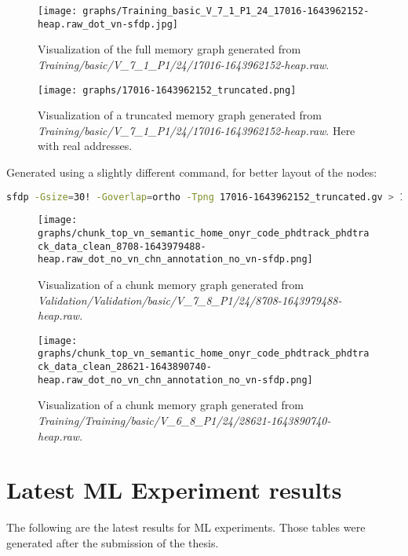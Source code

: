 \begin{figure}[H]\label{appendix:mem_graph:17016-1643962152:full}
    \centering
    \texttt{[image: graphs/Training\_basic\_V\_7\_1\_P1\_24\_17016-1643962152-heap.raw\_dot\_vn-sfdp.jpg]}
    \caption{Visualization of the full memory graph generated from \textit{Training/basic/V\_7\_1\_P1/24/17016-1643962152-heap.raw}.}
\end{figure}

\begin{figure}[H]\label{appendix:mem_graph:17016-1643962152:truncated}
    \centering
    \texttt{[image: graphs/17016-1643962152\_truncated.png]}
    \caption{Visualization of a truncated memory graph generated from \textit{Training/basic/V\_7\_1\_P1/24/17016-1643962152-heap.raw}. Here with real addresses.}
\end{figure}

Generated using a slightly different command, for better layout of the nodes:

\begin{lstlisting}[language=bash, caption={Command used to generate the memory graph visualization of \textit{Training/basic/V\_7\_1\_P1/24/17016-1643962152-heap.raw} here using real addresses.}]
    sfdp -Gsize=30! -Goverlap=ortho -Tpng 17016-1643962152_truncated.gv > 17016-1643962152_truncated.png
\end{lstlisting}

\begin{figure}[H]
    \centering
    \texttt{[image: graphs/chunk\_top\_vn\_semantic\_home\_onyr\_code\_phdtrack\_phdtrack\_data\_clean\_8708-1643979488-heap.raw\_dot\_no\_vn\_chn\_annotation\_no\_vn-sfdp.png]}
    \caption{Visualization of a chunk memory graph generated from \textit{Validation/Validation/basic/V\_7\_8\_P1/24/8708-1643979488-heap.raw}.}
\end{figure}

\begin{figure}[H]
    \centering
    \texttt{[image: graphs/chunk\_top\_vn\_semantic\_home\_onyr\_code\_phdtrack\_phdtrack\_data\_clean\_28621-1643890740-heap.raw\_dot\_no\_vn\_chn\_annotation\_no\_vn-sfdp.png]}
    \caption{Visualization of a chunk memory graph generated from \textit{Training/Training/basic/V\_6\_8\_P1/24/28621-1643890740-heap.raw}.}
\end{figure}

\section{Latest ML Experiment results}
The following are the latest results for ML experiments. Those tables were generated after the submission of the thesis.

